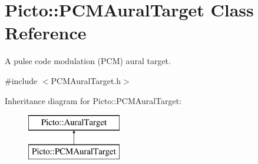 \hypertarget{class_picto_1_1_p_c_m_aural_target}{\section{Picto\-:\-:P\-C\-M\-Aural\-Target Class Reference}
\label{class_picto_1_1_p_c_m_aural_target}
}


A pulse code modulation (P\-C\-M) aural target.  




{\ttfamily \#include $<$P\-C\-M\-Aural\-Target.\-h$>$}

Inheritance diagram for Picto\-:\-:P\-C\-M\-Aural\-Target\-:\begin{figure}[H]
\begin{center}
\leavevmode
\includegraphics[height=2.000000cm]{class_picto_1_1_p_c_m_aural_target}
\end{center}
\end{figure}
